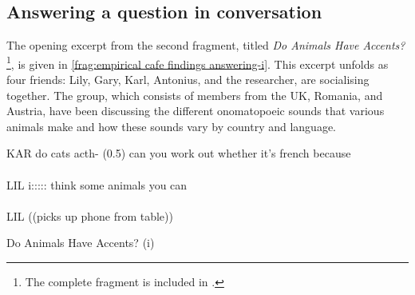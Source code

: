 \subsection{Answering a question in conversation}\label{sec:empirical cafe findings answering}
\begin{revisedsubmission}
The opening excerpt from the second fragment, titled \textit{Do Animals Have Accents?}\footnote{The complete fragment is included in .}, is given in \autoref{frag:empirical cafe findings answering-i}.
This excerpt unfolds as four friends: Lily, Gary, Karl, Antonius, and the researcher, are socialising together.
The group, which consists of members from the UK, Romania, and Austria, have been discussing the different onomatopoeic sounds that various animals make and how these sounds vary by country and language.

\begin{inlinefrag}
    {
    \begin{transcript}[5]
        \by KAR {do cats acth- (0.5) can you work out whether it's french because} \\
         \\
        \by LIL {i::::: think some animals you can} \\
         \\
        \by LIL {((picks up phone from table))} \\
    \end{transcript}
    \caption{Do Animals Have Accents? (i)}\label{frag:empirical cafe findings answering-i}
    }
\end{inlinefrag}


\end{revisedsubmission}
